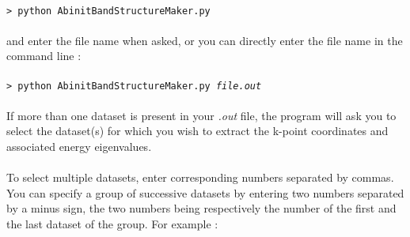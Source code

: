 \documentclass{article}
\begin{document}
\\
\texttt{> python AbinitBandStructureMaker.py} \\
\\
and enter the file name when asked, or you can directly enter the file name in the command line : \\
\\
\texttt{> python AbinitBandStructureMaker.py \textit{file.out}} \\
\\
If more than one dataset is present in your \textit{.out} file, the program will ask you to select the dataset(s) for which you wish to extract the k-point coordinates and associated energy eigenvalues. \\
\\
To select multiple datasets, enter corresponding numbers separated by commas.
You can specify a group of successive datasets by entering two numbers separated by a minus sign,
the two numbers being respectively the number of the first and the last dataset of the group. For example : \\
\end{document}
